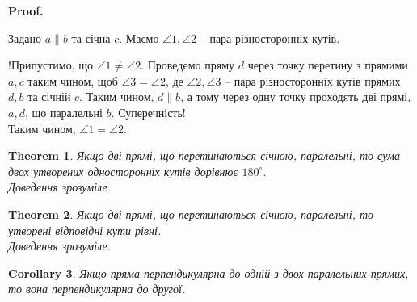 \documentclass[a4paper, 10pt]{article}
\makeatletter
\theoremstyle{theoremdd}
\newtheorem{theorem}{Theorem}[subsection]
\theoremstyle{theoremdd}
\theoremstyle{theoremdd}
\theoremstyle{theoremdd}
\theoremstyle{theoremdd}
\theoremstyle{theoremdd}
\theoremstyle{theoremdd}
\theoremstyle{theoremdd}
\theoremstyle{theoremdd}
\newtheorem{corollary}[theorem]{Corollary}
\renewenvironment{proof}[1][Proof.\\]{\par
\pushQED{\hfill \qed}%
\normalfont \topsep6\p@\@plus6\p@\relax
\trivlist
\item\relax
{\bfseries
#1\@addpunct{.}}\hspace\labelsep\ignorespaces
}{%
\popQED\endtrivlist\@endpefalse
}
\makeatother
\begin{document}
\begin{proof}
Задано $a \parallel b$ та січна $c$. Маємо $\angle 1, \angle 2$ -- пара різносторонніх кутів.
\begin{figure}[H]
\centering
{}
\end{figure}
!Припустимо, що $\angle 1 \neq \angle 2$. Проведемо пряму $d$ через точку перетину з прямими $a,c$ таким чином, щоб $\angle 3 = \angle 2$, де $\angle 2, \angle 3$ -- пара різносторонніх кутів прямих $d,b$ та січній $c$. Таким чином, $d \parallel b$, а тому через одну точку проходять дві прямі, $a,d$, що паралельні $b$. Суперечність!\\
Таким чином, $\angle 1 = \angle 2$.
\end{proof}

\begin{theorem}
Якщо дві прямі, що перетинаються січною, паралельні, то сума двох утворених односторонніх кутів дорівнює $180^\circ$.\\
\textit{Доведення зрозуміле.}
\end{theorem}

\begin{theorem}
Якщо дві прямі, що перетинаються січною, паралельні, то утворені відповідні кути рівні.\\
\textit{Доведення зрозуміле.}
\end{theorem}

\begin{corollary}
Якщо пряма перпендикулярна до одній з двох паралельних прямих, то вона перпендикулярна до другої.
\end{corollary}
\end{document}
